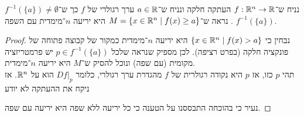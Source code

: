 \question{}
\subquestion{}
נניח ש־$f : \mathbb{R}^n \to \mathbb{R}$ העתקה חלקה ונניח ש־$a \in \mathbb{R}$ ערך רגולרי של $f$ כך ש־$f^{-1}(\{ a \}) \ne \emptyset$.
נראה ש־$M = \{ x \in \mathbb{R}^n \mid f(x) \ge a \}$ היא יריעה $n$־מימדית עם השפה $f^{-1}(\{ a \})$.
\begin{proof}
	נבחין כי $\{ x \in \mathbb{R}^n \mid f(x) > a \}$ היא יריעה $n$־מימדית כמקור של קבוצה פתוחה של פונקציה חלקה (בפרט רציפה).
	לכן מספיק שנראה שלכל $p \in f^{-1}(\{ a \})$ יש פרמטריזציה מקומית (עם שפה) ונוכל להסיק ש־$M$ היא יריעה $n$־מימדית. \\
	תהי $p$ כזו, אז $p$ היא נקודה רגולרית של $f$ מהגדרת ערך רגולרי, כלומר $D f |_p$ הוא על $\mathbb{R}^n$.
	אז ניקח את ההעתקה לא יודע

	נעיר כי בהוכחה התבססנו על הטענה כי כל יריעה ללא שפה היא יריעה עם שפה.
\end{proof}


